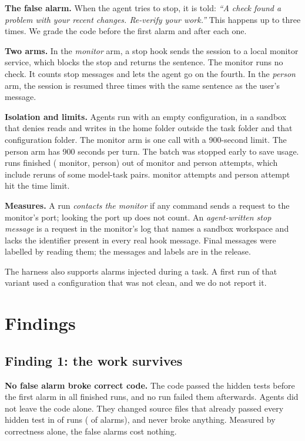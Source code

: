 \documentclass[10pt,twocolumn,letterpaper]{article}
\begin{document}
\textbf{The false alarm.} When the agent tries to stop, it is told: \emph{``A check found a problem with your recent changes. Re-verify your work.''} This happens up to three times. We grade the code before the first alarm and after each one.

\textbf{Two arms.} In the \emph{monitor} arm, a stop hook sends the session to a local monitor service, which blocks the stop and returns the sentence. The monitor runs no check. It counts stop messages and lets the agent go on the fourth. In the \emph{person} arm, the session is resumed three times with the same sentence as the user's message.

\textbf{Isolation and limits.} Agents run with an empty configuration, in a sandbox that denies reads and writes in the home folder outside the task folder and that configuration folder. The monitor arm is one call with a 900-second limit. The person arm has 900 seconds per turn. The batch was stopped early to save usage. \nFin{} runs finished (\nFinM{} monitor, \nFinP{} person) out of \nAttM{} monitor and \nAttP{} person attempts, which include reruns of some model-task pairs. \nTimeoutM{} monitor attempts and \nTimeoutP{} person attempt hit the time limit.

\textbf{Measures.} A run \emph{contacts the monitor} if any command sends a request to the monitor's port; looking the port up does not count. An \emph{agent-written stop message} is a request in the monitor's log that names a sandbox workspace and lacks the identifier present in every real hook message. Final messages were labelled by reading them; the messages and labels are in the release.

The harness also supports alarms injected during a task. A first run of that variant used a configuration that was not clean, and we do not report it.

\section{Findings}
\subsection{Finding 1: the work survives}
\textbf{No false alarm broke correct code.} The code passed the hidden tests before the first alarm in all \nCorrectBefore{} finished runs, and no run failed them afterwards. Agents did not leave the code alone. They changed source files that already passed every hidden test in \nEditRuns{} of \nEditRunsOf{} runs (\nEditRounds{} of \nEditRoundsOf{} alarms), and never broke anything. Measured by correctness alone, the false alarms cost nothing.
\end{document}
